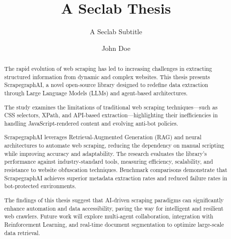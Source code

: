 \documentclass[english,master]{unibg}
\title{A Seclab Thesis}
\subtitle{A Seclab Subtitle}
\author{John Doe}
\begin{document}
\maketitle
\emptypage

\begin{abstract}
The rapid evolution of web scraping has led to increasing challenges in extracting structured information from dynamic and complex websites. This thesis presents ScrapegraphAI, a novel open-source library designed to redefine data extraction through Large Language Models (LLMs) and agent-based architectures. 

The study examines the limitations of traditional web scraping techniques—such as CSS selectors, XPath, and API-based extraction—highlighting their inefficiencies in handling JavaScript-rendered content and evolving anti-bot policies.

ScrapegraphAI  leverages Retrieval-Augmented Generation (RAG) and neural architectures to automate web scraping, reducing the dependency on manual scripting while improving accuracy and adaptability. The research evaluates the library's performance against industry-standard tools, measuring efficiency, scalability, and resistance to website obfuscation techniques. Benchmark comparisons demonstrate that ScrapegraphAI  achieves superior metadata extraction rates and reduced failure rates in bot-protected environments.

The findings of this thesis suggest that AI-driven scraping paradigms can significantly enhance automation and data accessibility, paving the way for intelligent and resilient web crawlers. Future work will explore multi-agent collaboration, integration with Reinforcement Learning, and real-time document segmentation to optimize large-scale data retrieval.
\end{abstract}

\emptypage
\toc
\emptypage

\clearpage
{}


\end{document}

